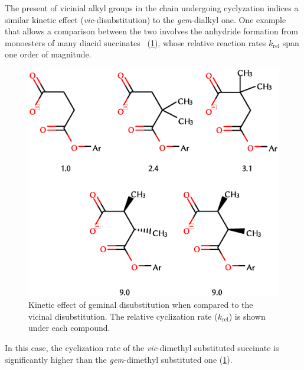 The present of vicinial alkyl groups in the chain undergoing cyclyzation
indices a similar kinetic effect (\emph{vic}-disubstitution)
to the \emph{gem}-dialkyl one.
One example that allows a comparison between the two
involves the anhydride formation from monoesters of many diacid
succinates~\cite{Kirby_1980,Bruice_1960a,Bruice_1960b,Bruice_1965,Lightstone_1994}
(\cref{fig:succinatos}), whose relative reaction rates
$k_\text{rel}$ span one order of magnitude.
%
\begin{figure}[hbtp]
	\centering
	\includegraphics[width=.75\textwidth]{figures/succinatos}
	\caption[Kinetic effects of geminal and vicinal disubstitutions.]{
		Kinetic effect of geminal disubstitution when compared to the vicinal disubstitution.
		The relative cyclization rate ($k_\text{rel}$)
		is shown under each compound.}\label{fig:succinatos}
\end{figure}
%
In this case, the
cyclization rate
of the
\emph{vic}-dimethyl substituted
succinate
is significantly higher than the \emph{gem}-dimethyl substituted one
(\cref{fig:succinatos}).

